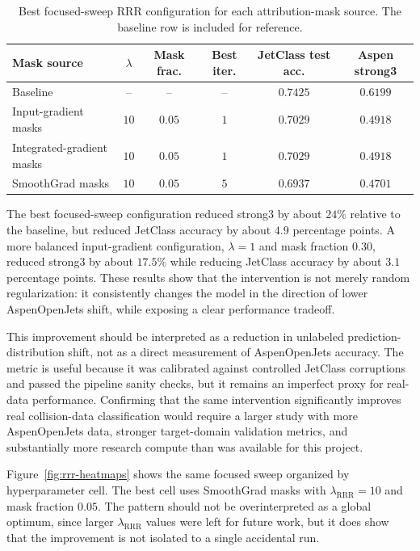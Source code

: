 \begin{table}[t]
\centering
\caption{Best focused-sweep RRR configuration for each attribution-mask source. The baseline row is included for reference.}
\label{tab:rrr-best-source}
\begin{tabular}{lccccc}
\toprule
Mask source & $\lambda$ & Mask frac. & Best iter. & JetClass test acc. & Aspen strong3 \\
\midrule
Baseline & -- & -- & -- & $0.7425$ & $0.6199$ \\
Input-gradient masks & $10$ & $0.05$ & $1$ & $0.7029$ & $0.4918$ \\
Integrated-gradient masks & $10$ & $0.05$ & $1$ & $0.7029$ & $0.4918$ \\
SmoothGrad masks & $10$ & $0.05$ & $5$ & $0.6937$ & $0.4701$ \\
\bottomrule
\end{tabular}
\end{table}

The best focused-sweep configuration reduced strong3 by about $24\%$ relative to the baseline, but reduced JetClass accuracy by about $4.9$ percentage points. A more balanced input-gradient configuration, $\lambda=1$ and mask fraction $0.30$, reduced strong3 by about $17.5\%$ while reducing JetClass accuracy by about $3.1$ percentage points. These results show that the intervention is not merely random regularization: it consistently changes the model in the direction of lower AspenOpenJets shift, while exposing a clear performance tradeoff.

This improvement should be interpreted as a reduction in unlabeled prediction-distribution shift, not as a direct measurement of AspenOpenJets accuracy. The metric is useful because it was calibrated against controlled JetClass corruptions and passed the pipeline sanity checks, but it remains an imperfect proxy for real-data performance. Confirming that the same intervention significantly improves real collision-data classification would require a larger study with more AspenOpenJets data, stronger target-domain validation metrics, and substantially more research compute than was available for this project.

Figure~\ref{fig:rrr-heatmaps} shows the same focused sweep organized by hyperparameter cell. The best cell uses SmoothGrad masks with $\lambda_{\mathrm{RRR}}=10$ and mask fraction $0.05$. The pattern should not be overinterpreted as a global optimum, since larger $\lambda_{\mathrm{RRR}}$ values were left for future work, but it does show that the improvement is not isolated to a single accidental run.

